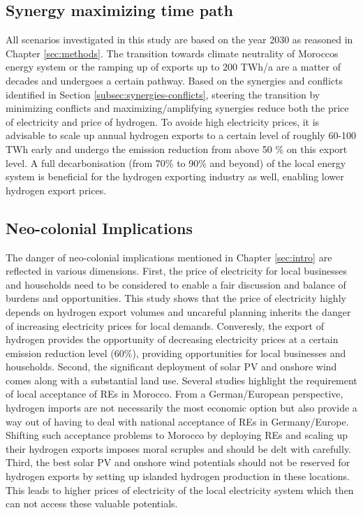 \subsection{Synergy maximizing time path}
\label{subsec:timepath}
All scenarios investigated in this study are based on the year 2030 as reasoned in Chapter \ref{sec:methods}. The transition towards climate neutrality of Moroccos energy system or the ramping up of exports up to 200 TWh/a are a matter of decades and undergoes a certain pathway. Based on the synergies and conflicts identified in Section \ref{subsec:synergies-conflicts}, steering the transition by minimizing conflicts and maximizing/amplifying synergies reduce both the price of electricity and price of hydrogen. To avoide high electricity prices, it is advisable to scale up annual hydrogen exports to a certain level of roughly 60-100 TWh early and undergo the emission reduction from above 50 \% on this export level. A full decarbonisation (from 70\% to 90\% and beyond) of the local energy system is beneficial for the hydrogen exporting industry as well, enabling lower hydrogen export prices.


\subsection{Neo-colonial Implications}
\label{subsec:neocolonial}
The danger of neo-colonial implications mentioned in Chapter \ref{sec:intro} are reflected in various dimensions. 
First, the price of electricity for local businesses and households need to be considered to enable a fair discussion and balance of burdens and opportunities. This study shows that the price of electricity highly depends on hydrogen export volumes and uncareful planning inherits the danger of increasing electricity prices for local demands. Converesly, the export of hydrogen provides the opportunity of decreasing electricity prices at a certain emission reduction level (60\%), providing opportunities for local businesses and households.
Second, the significant deployment of solar PV and onshore wind comes along with a substantial land use. Several studies \cite{TerraponPfaff2019, Hanger2016} highlight the requirement of local acceptance of REs in Morocco. From a German/European perspective, hydrogen imports are not necessarily the most economic option but also provide a way out of having to deal with national acceptance of REs in Germany/Europe. Shifting such acceptance problems to Morocco by deploying REs and scaling up their hydrogen exports imposes moral scruples and should be delt with carefully. %
Third, the best solar PV and onshore wind potentials should not be reserved for hydrogen exports by setting up islanded hydrogen production in these locations. This leads to higher prices of electricity of the local electricity system which then can not access these valuable potentials.

